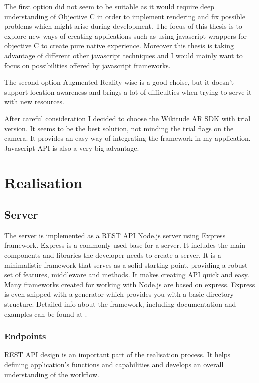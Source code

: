 \documentclass[thesis=M,english]{FITthesis}[2012/10/20]
\begin{document}
The first option did not seem to be suitable as it would require deep understanding of Objective C in order to implement rendering and fix possible problems which might arise during development. The focus of this thesis is to explore new ways of creating applications such as using javascript wrappers for objective C to create pure native experience. Moreover this thesis is taking advantage of different other javascript techniques and I would mainly want to focus on possibilities offered by javascript frameworks.

The second option Augmented Reality wise is a good choise, but it doesn't support location awareness and brings a lot of difficulties when trying to serve it with new resources.

After careful consideration I decided to choose the Wikitude AR SDK with trial version. It seems to be the best solution, not minding the trial flags on the camera. It provides an easy way of integrating the framework in my application. Javascript API is also a very big advantage.



\chapter{Realisation}

\section{Server}


The server is implemented as a REST API Node.js server using Express framework. Express is a commonly used base for a server. It includes the main components and libraries the developer needs to create a server. It is a minimalistic framework that serves as a solid starting point, providing a robust set of features, middleware and methods. It makes creating API quick and easy. Many frameworks created for working with Node.js are based on express. Express is even shipped with a generator which provides you with a basic directory structure. Detailed info about the framework, including documentation and examples can be found at \cite{express}. 
\subsection{Endpoints}
REST API design is an important part of the realisation process. It helps defining application's functions and capabilities and develops an overall understanding of the workflow.
\end{document}
